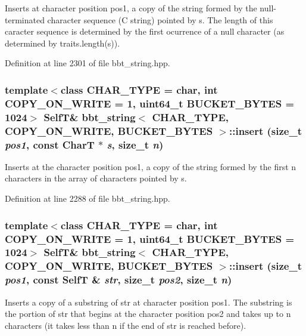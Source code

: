 Inserts at character position pos1, a copy of the string formed by the null-terminated character sequence (C string) pointed by s. The length of this caracter sequence is determined by the first ocurrence of a null character (as determined by traits.length(s)). 

Definition at line 2301 of file bbt\_\-string.hpp.\hypertarget{classbbt__string_0912d29c711b1f67e066d6bbf1203adc}{
\subsubsection[{insert}]{\setlength{\rightskip}{0pt plus 5cm}template$<$class CHAR\_\-TYPE  = char, int COPY\_\-ON\_\-WRITE = 1, uint64\_\-t BUCKET\_\-BYTES = 1024$>$ {\bf SelfT}\& {\bf bbt\_\-string}$<$ CHAR\_\-TYPE, COPY\_\-ON\_\-WRITE, BUCKET\_\-BYTES $>$::insert (size\_\-t {\em pos1}, \/  const CharT $\ast$ {\em s}, \/  size\_\-t {\em n})}}
\label{classbbt__string_0912d29c711b1f67e066d6bbf1203adc}


Inserts at the character position pos1, a copy of the string formed by the first n characters in the array of characters pointed by s. 

Definition at line 2288 of file bbt\_\-string.hpp.\hypertarget{classbbt__string_fe7cd0b9d0f147a22424695cca30e463}{
\subsubsection[{insert}]{\setlength{\rightskip}{0pt plus 5cm}template$<$class CHAR\_\-TYPE  = char, int COPY\_\-ON\_\-WRITE = 1, uint64\_\-t BUCKET\_\-BYTES = 1024$>$ {\bf SelfT}\& {\bf bbt\_\-string}$<$ CHAR\_\-TYPE, COPY\_\-ON\_\-WRITE, BUCKET\_\-BYTES $>$::insert (size\_\-t {\em pos1}, \/  const {\bf SelfT} \& {\em str}, \/  size\_\-t {\em pos2}, \/  size\_\-t {\em n})}}
\label{classbbt__string_fe7cd0b9d0f147a22424695cca30e463}


Inserts a copy of a substring of str at character position pos1. The substring is the portion of str that begins at the character position pos2 and takes up to n characters (it takes less than n if the end of str is reached before). 


